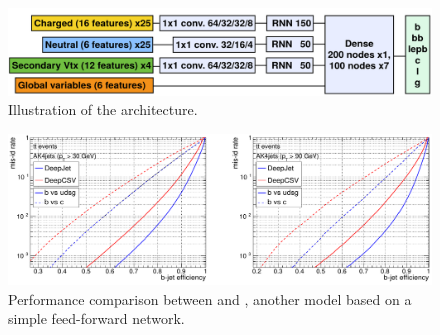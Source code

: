 \begin{figure}[H]
    \centering
    \includegraphics[width=0.75\linewidth]{fig//chap04-reco/deepjet.png}
    \caption{Illustration of the \DeepJet architecture. \cite{Bols2020JetDeepJet}}
    \label{fig:DeepJet}
\end{figure}
\begin{figure}[H]
    \centering
    \includegraphics[width=\linewidth]{fig//chap04-reco/bjet.png}
    \caption{Performance comparison between \DeepJet and \DeepCSV, another model based on a simple feed-forward network. \cite{Bols2020JetDeepJet}}
    \label{fig:btag_perform}
\end{figure}



